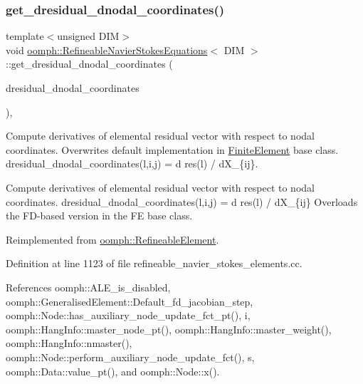 \subsubsection{\texorpdfstring{get\+\_\+dresidual\+\_\+dnodal\+\_\+coordinates()}{get\_dresidual\_dnodal\_coordinates()}}
{\footnotesize\ttfamily template$<$unsigned D\+IM$>$ \\
void \hyperlink{classoomph_1_1RefineableNavierStokesEquations}{oomph\+::\+Refineable\+Navier\+Stokes\+Equations}$<$ D\+IM $>$\+::get\+\_\+dresidual\+\_\+dnodal\+\_\+coordinates (\begin{DoxyParamCaption}\item[{\hyperlink{classoomph_1_1RankThreeTensor}{Rank\+Three\+Tensor}$<$ double $>$ \&}]{dresidual\+\_\+dnodal\+\_\+coordinates }\end{DoxyParamCaption})\hspace{0.3cm}{\ttfamily [protected]}, {\ttfamily [virtual]}}



Compute derivatives of elemental residual vector with respect to nodal coordinates. Overwrites default implementation in \hyperlink{classoomph_1_1FiniteElement}{Finite\+Element} base class. dresidual\+\_\+dnodal\+\_\+coordinates(l,i,j) = d res(l) / d\+X\+\_\+\{ij\}. 

Compute derivatives of elemental residual vector with respect to nodal coordinates. dresidual\+\_\+dnodal\+\_\+coordinates(l,i,j) = d res(l) / d\+X\+\_\+\{ij\} Overloads the F\+D-\/based version in the FE base class. 

Reimplemented from \hyperlink{classoomph_1_1RefineableElement_a83d4f26d6f427a6c9001c65c4263c622}{oomph\+::\+Refineable\+Element}.



Definition at line 1123 of file refineable\+\_\+navier\+\_\+stokes\+\_\+elements.\+cc.



References oomph\+::\+A\+L\+E\+\_\+is\+\_\+disabled, oomph\+::\+Generalised\+Element\+::\+Default\+\_\+fd\+\_\+jacobian\+\_\+step, oomph\+::\+Node\+::has\+\_\+auxiliary\+\_\+node\+\_\+update\+\_\+fct\+\_\+pt(), i, oomph\+::\+Hang\+Info\+::master\+\_\+node\+\_\+pt(), oomph\+::\+Hang\+Info\+::master\+\_\+weight(), oomph\+::\+Hang\+Info\+::nmaster(), oomph\+::\+Node\+::perform\+\_\+auxiliary\+\_\+node\+\_\+update\+\_\+fct(), s, oomph\+::\+Data\+::value\+\_\+pt(), and oomph\+::\+Node\+::x().

\mbox{\label{classoomph_1_1RefineableNavierStokesEquations_a94c16c8b4aa810e9e2f8df263654eaed}} 
